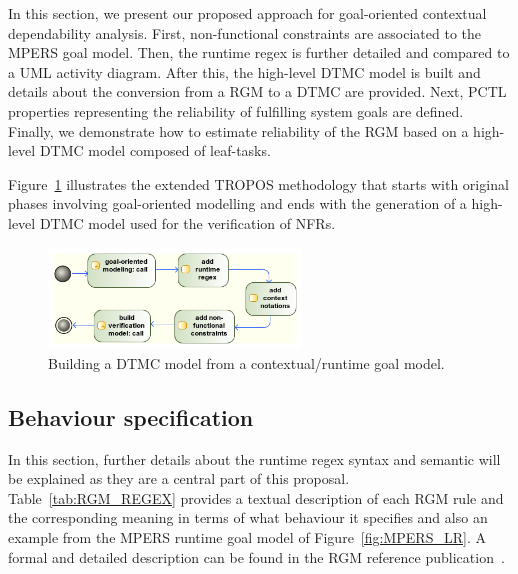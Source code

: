 In this section, we present our proposed approach for goal-oriented contextual dependability analysis. First, non-functional constraints are associated to the MPERS goal model. Then, the runtime regex is further detailed and compared to a UML activity diagram. After this, the high-level DTMC model is built and details about the conversion from a RGM to a DTMC are provided. Next, PCTL properties representing the reliability of fulfilling system goals are defined. Finally, we demonstrate how to estimate reliability of the RGM based on a high-level DTMC model composed of leaf-tasks.


Figure~\ref{fig:CRGM_TO_DTMC} illustrates the extended TROPOS methodology that starts with original phases involving goal-oriented modelling and ends with the generation of a high-level DTMC model used for the verification of NFRs.

\begin{figure}[h!]
\centering
\includegraphics[width=0.60\textwidth]{imgs/CRGM_TO_DTMC.png}
\caption{Building a DTMC model from a contextual/runtime goal model.}
\label{fig:CRGM_TO_DTMC}
\end{figure}

\subsection{Behaviour specification}

In this section, further details about the runtime regex syntax and semantic will be explained as they are a central part of this proposal. Table~\ref{tab:RGM_REGEX} provides a textual description of each RGM rule and the corresponding meaning in terms of what behaviour it specifies and also an example from the MPERS runtime goal model of Figure~\ref{fig:MPERS_LR}. A formal and detailed description can be found in the RGM reference publication~\cite{Dalpiaz:2013}.

